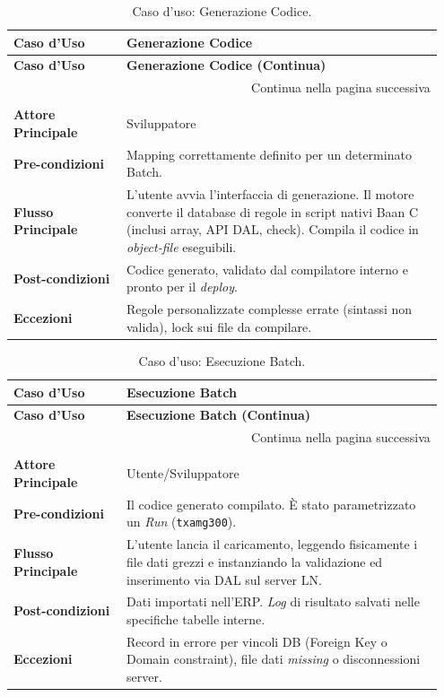 \begin{longtable}{@{} p{0.25\linewidth} p{0.70\linewidth} @{}}
    \toprule
    \textbf{Caso d'Uso} & \textbf{Generazione Codice} \\
    \midrule
    \endfirsthead
    \toprule
    \textbf{Caso d'Uso} & \textbf{Generazione Codice (Continua)} \\
    \midrule
    \endhead
    \midrule
    \multicolumn{2}{r}{{Continua nella pagina successiva}} \\
    \bottomrule
    \endfoot
    \bottomrule
    \caption{Caso d'uso: Generazione Codice.} \label{tab:uc_generazione_codice} \\
    \endlastfoot
    \textbf{Attore Principale} & Sviluppatore \\
    \midrule
    \textbf{Pre-condizioni} & Mapping correttamente definito per un determinato Batch. \\
    \midrule
    \textbf{Flusso Principale} & L'utente avvia l'interfaccia di generazione. Il motore converte il database di regole in script nativi Baan C (inclusi array, API DAL, check). Compila il codice in \textit{object-file} eseguibili. \\
    \midrule
    \textbf{Post-condizioni} & Codice generato, validato dal compilatore interno e pronto per il \textit{deploy}. \\
    \midrule
    \textbf{Eccezioni} & Regole personalizzate complesse errate (sintassi non valida), lock sui file da compilare. \\
\end{longtable}

\begin{longtable}{@{} p{0.25\linewidth} p{0.70\linewidth} @{}}
    \toprule
    \textbf{Caso d'Uso} & \textbf{Esecuzione Batch} \\
    \midrule
    \endfirsthead
    \toprule
    \textbf{Caso d'Uso} & \textbf{Esecuzione Batch (Continua)} \\
    \midrule
    \endhead
    \midrule
    \multicolumn{2}{r}{{Continua nella pagina successiva}} \\
    \bottomrule
    \endfoot
    \bottomrule
    \caption{Caso d'uso: Esecuzione Batch.} \label{tab:uc_esecuzione_batch} \\
    \endlastfoot
    \textbf{Attore Principale} & Utente/Sviluppatore \\
    \midrule
    \textbf{Pre-condizioni} & Il codice generato compilato. È stato parametrizzato un \textit{Run} (\texttt{txamg300}). \\
    \midrule
    \textbf{Flusso Principale} & L'utente lancia il caricamento, leggendo fisicamente i file dati grezzi e instanziando la validazione ed inserimento via DAL sul server LN. \\
    \midrule
    \textbf{Post-condizioni} & Dati importati nell'ERP. \textit{Log} di risultato salvati nelle specifiche tabelle interne. \\
    \midrule
    \textbf{Eccezioni} & Record in errore per vincoli DB (Foreign Key o Domain constraint), file dati \textit{missing} o disconnessioni server. \\
\end{longtable}

